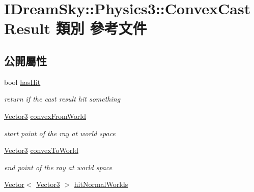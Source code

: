\hypertarget{class_i_dream_sky_1_1_physics3_1_1_convex_cast_result}{}\section{I\+Dream\+Sky\+:\+:Physics3\+:\+:Convex\+Cast\+Result 類別 參考文件}
\label{class_i_dream_sky_1_1_physics3_1_1_convex_cast_result}
\subsection*{公開屬性}
\begin{DoxyCompactItemize}
\item 
bool \hyperlink{class_i_dream_sky_1_1_physics3_1_1_convex_cast_result_ae2aa59be3806218a3f46f30a8777e9c5}{has\+Hit}\hypertarget{class_i_dream_sky_1_1_physics3_1_1_convex_cast_result_ae2aa59be3806218a3f46f30a8777e9c5}{}\label{class_i_dream_sky_1_1_physics3_1_1_convex_cast_result_ae2aa59be3806218a3f46f30a8777e9c5}

\begin{DoxyCompactList}\small\item\em return if the cast result hit something \end{DoxyCompactList}\item 
\hyperlink{class_i_dream_sky_1_1_vector3}{Vector3} \hyperlink{class_i_dream_sky_1_1_physics3_1_1_convex_cast_result_a7f8cf68325bdec1a3e3d3bd6998e6a44}{convex\+From\+World}\hypertarget{class_i_dream_sky_1_1_physics3_1_1_convex_cast_result_a7f8cf68325bdec1a3e3d3bd6998e6a44}{}\label{class_i_dream_sky_1_1_physics3_1_1_convex_cast_result_a7f8cf68325bdec1a3e3d3bd6998e6a44}

\begin{DoxyCompactList}\small\item\em start point of the ray at world space \end{DoxyCompactList}\item 
\hyperlink{class_i_dream_sky_1_1_vector3}{Vector3} \hyperlink{class_i_dream_sky_1_1_physics3_1_1_convex_cast_result_abc9fd03968197b1cd6e7436222199d54}{convex\+To\+World}\hypertarget{class_i_dream_sky_1_1_physics3_1_1_convex_cast_result_abc9fd03968197b1cd6e7436222199d54}{}\label{class_i_dream_sky_1_1_physics3_1_1_convex_cast_result_abc9fd03968197b1cd6e7436222199d54}

\begin{DoxyCompactList}\small\item\em end point of the ray at world space \end{DoxyCompactList}\item 
\hyperlink{class_i_dream_sky_1_1_vector}{Vector}$<$ \hyperlink{class_i_dream_sky_1_1_vector3}{Vector3} $>$ \hyperlink{class_i_dream_sky_1_1_physics3_1_1_convex_cast_result_a7a31e9183bcd3d14399d9b76762c99c9}{hit\+Normal\+Worlds}\hypertarget{class_i_dream_sky_1_1_physics3_1_1_convex_cast_result_a7a31e9183bcd3d14399d9b76762c99c9}{}\label{class_i_dream_sky_1_1_physics3_1_1_convex_cast_result_a7a31e9183bcd3d14399d9b76762c99c9}


\end{DoxyCompactItemize}
